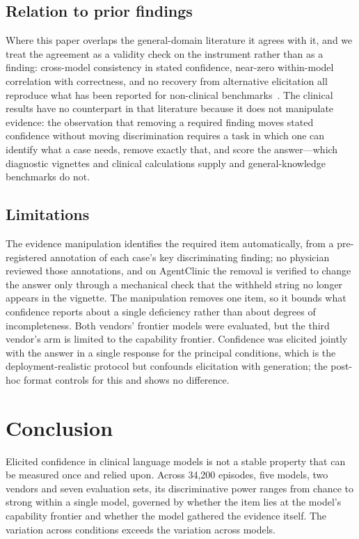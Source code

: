 \documentclass[journal,twoside]{IEEEtran}
\begin{document}
\subsection{Relation to prior findings}
Where this paper overlaps the general-domain literature it agrees with it, and we treat the
agreement as a validity check on the instrument rather than as a finding: cross-model consistency in
stated confidence, near-zero within-model correlation with correctness, and no recovery from
alternative elicitation all reproduce what has been reported for non-clinical
benchmarks~\cite{metacog2026,xiong2023}. The clinical results have
no counterpart in that literature because it does not manipulate evidence: the observation that
removing a required finding moves stated confidence without moving discrimination requires a task in
which one can identify what a case needs, remove exactly that, and score the answer---which
diagnostic vignettes and clinical calculations supply and general-knowledge benchmarks do not.

\subsection{Limitations}
The evidence manipulation identifies the required item automatically, from a pre-registered
annotation of each case's key discriminating finding; no physician reviewed those annotations, and on
AgentClinic the removal is verified to change the answer only through a mechanical check that the
withheld string no longer appears in the vignette. The manipulation removes one item, so it bounds
what confidence reports about a single deficiency rather than about degrees of incompleteness. Both
vendors' frontier models were evaluated, but the third vendor's arm is limited to the capability
frontier. Confidence was elicited jointly with the answer in a single response for the
principal conditions, which is the deployment-realistic protocol but confounds elicitation with
generation; the post-hoc format controls for this and shows no difference. 

\section{Conclusion}
Elicited confidence in clinical language models is not a stable property that can be measured once
and relied upon. Across 34{,}200 episodes, five models, two vendors and seven evaluation sets, its
discriminative power ranges from chance to strong within a single model, governed by whether the
item lies at the model's capability frontier and whether the model gathered the evidence itself. The variation across conditions exceeds the variation
across models.
\end{document}
